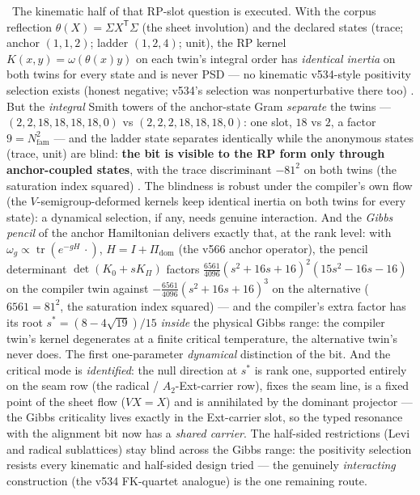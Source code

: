 \documentclass[11pt,a4paper]{article}
\newcommand{\Nfam}{N_{\mathrm{fam}}}
\theoremstyle{definition}
\begin{document}
\begin{winbox}
\ The kinematic half of that RP-slot question is executed.  With the
corpus reflection $\theta(X)=\Sigma X^{\mathsf T}\Sigma$ (the sheet involution) and the declared
states (trace; anchor $(1,1,2)$; ladder $(1,2,4)$; unit), the RP kernel
$K(x,y)=\omega(\theta(x)y)$ on each twin's integral order has \emph{identical inertia} on both
twins for every state and is never PSD --- no kinematic v534-style positivity selection exists
(honest negative; v534's selection was nonperturbative there too) \mE.  But the \emph{integral}
Smith towers of the anchor-state Gram \emph{separate} the twins --- $(2,2,18,18,18,18,0)$ vs
$(2,2,2,18,18,18,0)$: one slot, $18$ vs $2$, a factor $9=\Nfam^2$ --- and the ladder state
separates identically while the anonymous states (trace, unit) are blind: \textbf{the bit is
visible to the RP form only through anchor-coupled states}, with the trace discriminant
$-81^2$ on both twins (the saturation index squared) \mE.  The blindness is robust under the
compiler's own flow (the $V$-semigroup-deformed kernels keep identical inertia on both twins
for every state): a dynamical selection, if any, needs genuine interaction.  And the
\emph{Gibbs pencil} of the anchor Hamiltonian delivers exactly that, at the rank level: with
$\omega_g\propto\operatorname{tr}(e^{-gH}\,\cdot)$, $H=I+\Pi_{\mathrm{dom}}$ (the v566
anchor operator), the pencil determinant $\det(K_0+sK_\Pi)$ factors
$\tfrac{6561}{4096}(s^2{+}16s{+}16)^2(15s^2{-}16s{-}16)$ on the compiler twin against
$-\tfrac{6561}{4096}(s^2{+}16s{+}16)^3$ on the alternative ($6561=81^2$, the saturation index
squared) --- and the compiler's extra factor has its root $s^*=(8-4\sqrt{19})/15$ \emph{inside}
the physical Gibbs range: the compiler twin's kernel degenerates at a finite critical
temperature, the alternative twin's never does.  The first one-parameter \emph{dynamical}
distinction of the bit.  And the critical mode is \emph{identified}: the null direction at
$s^*$ is rank one, supported entirely on the seam row (the radical / $A_2$-Ext-carrier row),
fixes the seam line, is a fixed point of the sheet flow ($VX=X$) and is annihilated by the
dominant projector --- the Gibbs criticality lives exactly in the Ext-carrier slot, so the
typed resonance with the alignment bit now has a \emph{shared carrier}.  The half-sided
restrictions (Levi and radical sublattices) stay blind across the Gibbs range: the positivity
selection resists every kinematic and half-sided design tried --- the genuinely
\emph{interacting} construction (the v534 FK-quartet analogue) is the one remaining route.

\end{winbox}
\end{document}

